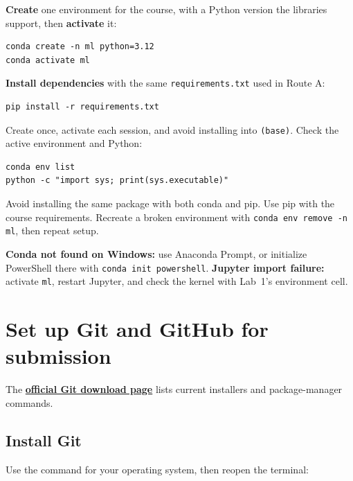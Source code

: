 \textbf{Create} one environment for the course, with a Python version the libraries support, then \textbf{activate} it:

\begin{lstlisting}[style=mlterminal]
conda create -n ml python=3.12
conda activate ml
\end{lstlisting}

\textbf{Install dependencies} with the same \texttt{requirements.txt} used in Route A:

\begin{lstlisting}[style=mlterminal]
pip install -r requirements.txt
\end{lstlisting}

Create once, activate each session, and avoid installing into \texttt{(base)}. Check the active environment and Python:

\begin{lstlisting}[style=mlterminal]
conda env list
python -c "import sys; print(sys.executable)"
\end{lstlisting}

\begin{pitfall}
Avoid installing the same package with both conda and pip. Use pip with the course requirements. Recreate a broken environment with \texttt{conda env remove -n ml}, then repeat setup.
\end{pitfall}

\begin{troubleshoot}
\textbf{Conda not found on Windows:} use Anaconda Prompt, or initialize PowerShell there with \texttt{conda init powershell}. \textbf{Jupyter import failure:} activate \texttt{ml}, restart Jupyter, and check the kernel with Lab~1's environment cell.
\end{troubleshoot}

\section{Set up Git and GitHub for submission}

The \href{https://git-scm.com/install/}{\textbf{official Git download page}} lists current installers and package-manager commands.

\subsection{Install Git}

Use the command for your operating system, then reopen the terminal:

